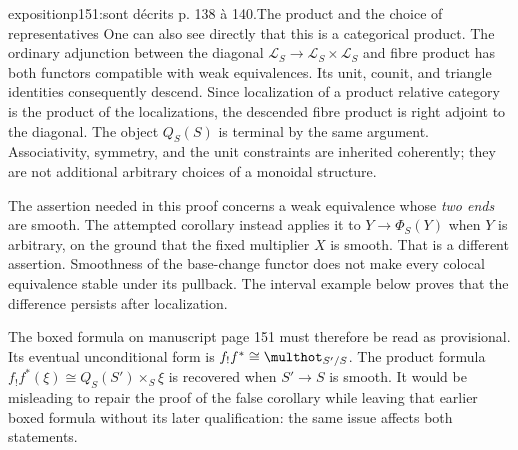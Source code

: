 \begin{dcomment}{exposition}{p151:sont décrits p. 138 à 140.}{The product and the choice of representatives}
One can also see directly that this is a categorical product. The ordinary adjunction between the diagonal $\mathcal L_S\to\mathcal L_S\times\mathcal L_S$ and fibre product has both functors compatible with weak equivalences. Its unit, counit, and triangle identities consequently descend. Since localization of a product relative category is the product of the localizations, the descended fibre product is right adjoint to the diagonal. The object $Q_S(S)$ is terminal by the same argument. Associativity, symmetry, and the unit constraints are inherited coherently; they are not additional arbitrary choices of a monoidal structure.

The assertion needed in this proof concerns a weak equivalence whose \emph{two ends} are smooth. The attempted corollary instead applies it to $Y\to\Phi_S(Y)$ when $Y$ is arbitrary, on the ground that the fixed multiplier $X$ is smooth. That is a different assertion. Smoothness of the base-change functor does not make every colocal equivalence stable under its pullback. The interval example below proves that the difference persists after localization.

The boxed formula on manuscript page 151 must therefore be read as provisional. Its eventual unconditional form is $f_!f^*\cong\multhot_{S'/S}$. The product formula $f_!f^*(\xi)\cong Q_S(S')\times_S\xi$ is recovered when $S'\to S$ is smooth. It would be misleading to repair the proof of the false corollary while leaving that earlier boxed formula without its later qualification: the same issue affects both statements.
\end{dcomment}


